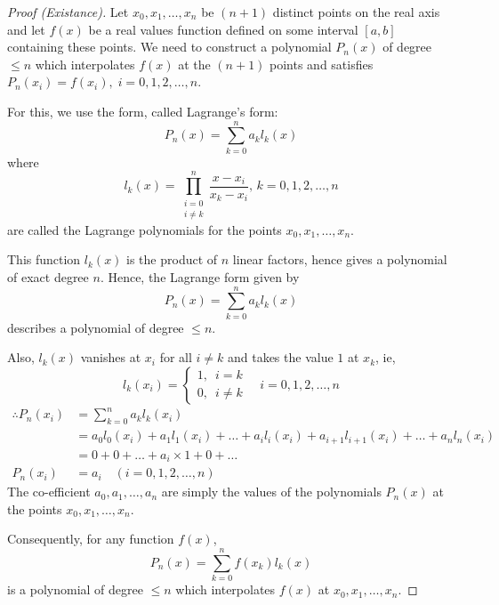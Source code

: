 \documentclass[12pt,class=book,crop=false]{standalone}
\begin{document}
\begin{proof}[Proof (Existance)]
    Let \(  x_0,x_1,\dots,x_n \) be \(  (n+1) \) distinct points on the real axis and let \(  f(x) \) be a real values function defined on some interval \(  [a,b] \) containing these points. We need to construct a polynomial \(  P_n(x) \) of degree \(  \leq n \) which interpolates \(  f(x) \) at the \(  (n+1) \) points and satisfies \(  P_n(x_i)=f(x_i),\; i=0,1,2,\dots ,n \).

    For this, we use the form, called Lagrange's form:
    \[P_n(x)=\sum_{k=0}^na_kl_k(x)\] where \[l_k(x)=\prod_{\substack{i=0\\ i\neq k}}^n\frac{x-x_i}{x_k-x_i},\,k=0,1,2,\dots,n\]are called the Lagrange polynomials for the points \(  x_0,x_1,\dots,x_n \).

    This function \(  l_k(x) \) is the product of \(  n \) linear factors, hence gives a polynomial of exact degree \(  n \).  Hence, the Lagrange form given by\[P_n(x)=\sum_{k=0}^na_kl_k(x)\]describes a polynomial of degree \(  \leq n \).

    Also, \(  l_k(x) \) vanishes at \(  x_i \) for all \(  i\neq k \) and takes the value \(  1 \) at \(  x_k \), ie,
    \[l_k(x_i)=\begin{cases}
            1, \,\,\, i=k \\
            0, \,\,\, i\neq k
        \end{cases}\quad i=0,1,2,\dots,n\]
    \begin{align*}
        \therefore P_n(x_i) & = \sum_{k=0}^n a_kl_k(x_i)                                                           \\
                            & = a_0l_0(x_i)+ a_1l_1(x_i)+\dots+ a_il_i(x_i)+ a_{i+1}l_{i+1}(x_i)+\dots+ a_nl_n(x_i) \\
                            & = 0+0+\dots+a_i\times 1+0+\dots                                                      \\
        P_n(x_i)            & =a_i\quad (i=0,1,2,\dots ,n)
    \end{align*}
    The co-efficient \(  a_0,a_1,\dots,a_n \) are simply the values of the polynomials \(  P_n(x) \) at the points \(  x_0,x_1,\dots,x_n \).

    Consequently, for any function \(  f(x) \),\[P_n(x)=\sum_{k=0}^nf(x_k)l_k(x)\]is a polynomial of degree \(  \leq n \) which interpolates \(  f(x) \) at \(  x_0,x_1,\dots,x_n \).
\end{proof}
\newpage
\end{document}
